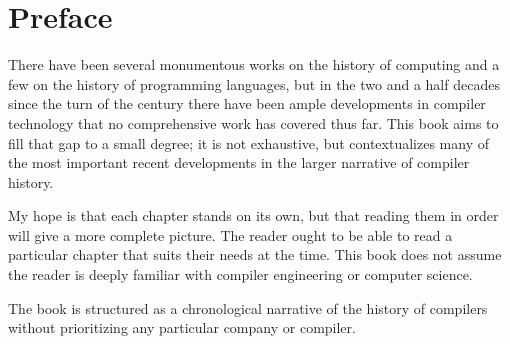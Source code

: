\chapter{Preface}

There have been several monumentous works on the history of computing and a few on
the history of programming languages, but in the two and a half decades since the turn
of the century there have been ample developments in compiler technology that
no comprehensive work has covered thus far.
This book aims to fill that gap to a small degree; it is not exhaustive, but
contextualizes many of the most important recent developments in the larger
narrative of compiler history.

My hope is that each chapter stands on its own, but that reading them in order will give a more complete picture.
The reader ought to be able to read a particular chapter that suits their needs at the time.
This book does not assume the reader is deeply familiar with compiler engineering or computer science.

The book is structured as a chronological narrative of the history of compilers
without prioritizing any particular company or compiler.
